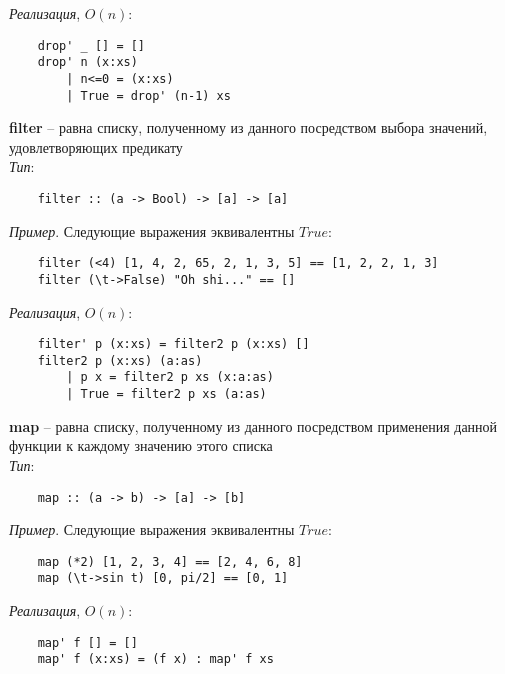 \documentclass{article}
\begin{document}
	\null\textit{Реализация}, $O(n)$:
	\begin{lstlisting}
	drop' _ [] = []
	drop' n (x:xs)
		| n<=0 = (x:xs)
		| True = drop' (n-1) xs
	\end{lstlisting}

	\null\textbf{filter} -- равна списку, полученному из данного посредством выбора значений, удовлетворяющих предикату\\

	\textit{Тип}:
	\begin{lstlisting}
	filter :: (a -> Bool) -> [a] -> [a]
	\end{lstlisting}

	\null\textit{Пример}. Следующие выражения эквивалентны $True$:
	\begin{lstlisting}
	filter (<4) [1, 4, 2, 65, 2, 1, 3, 5] == [1, 2, 2, 1, 3]
	filter (\t->False) "Oh shi..." == []
	\end{lstlisting}

	\null\textit{Реализация}, $O(n)$:
	\begin{lstlisting}
	filter' p (x:xs) = filter2 p (x:xs) []
	filter2 p (x:xs) (a:as)
		| p x = filter2 p xs (x:a:as)
		| True = filter2 p xs (a:as)
	\end{lstlisting}

	\null\textbf{map} -- равна списку, полученному из данного посредством применения данной функции к каждому значению этого списка\\

	\textit{Тип}:
	\begin{lstlisting}
	map :: (a -> b) -> [a] -> [b]
	\end{lstlisting}

	\null\textit{Пример}. Следующие выражения эквивалентны $True$:
	\begin{lstlisting}
	map (*2) [1, 2, 3, 4] == [2, 4, 6, 8]
	map (\t->sin t) [0, pi/2] == [0, 1]
	\end{lstlisting}

	\null\textit{Реализация}, $O(n)$:
	\begin{lstlisting}
	map' f [] = []
	map' f (x:xs) = (f x) : map' f xs
	\end{lstlisting}
\end{document}
